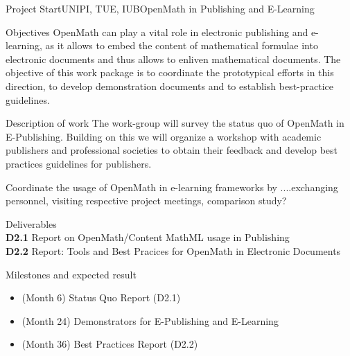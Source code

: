 \documentclass{euproposal}
\begin{document}
\begin{workpackage}{36}{2}{Project Start}{UNIPI, TUE, IUB}{OpenMath in Publishing
    and E-Learning}
\begin{wpbox}{Objectives}
  OpenMath can play a vital role in electronic publishing and e-learning, as it
  allows to embed the content of mathematical formulae into electronic documents
  and thus allows to enliven mathematical documents. The objective of this work
  package is to coordinate the prototypical efforts in this direction, to develop
  demonstration documents and to establish best-practice guidelines.
\end{wpbox}
\begin{wpbox}{Description of work}
  The work-group will survey the status quo of OpenMath in E-Publishing.  Building on this
  we will organize a workshop with academic publishers and professional societies to
  obtain their feedback and develop best practices guidelines for publishers.
  
  Coordinate the usage of OpenMath in e-learning frameworks by ....exchanging personnel,
  visiting respective project meetings, comparison study?
\end{wpbox}
\begin{wpbox}{Deliverables\\}
{\bf D2.1} Report on OpenMath/Content MathML usage in Publishing\\
{\bf D2.2} Report: Tools and Best Pracices for OpenMath in Electronic Documents
\end{wpbox}
\begin{wpbox}{Milestones and expected result}
\begin{itemize}
\item (Month 6) Status Quo Report (D2.1)
\item (Month 24) Demonstrators for E-Publishing and E-Learning 
\item (Month 36) Best Practices Report (D2.2)
\end{itemize}
\end{wpbox}
\end{workpackage}
\newpage
\end{document}
